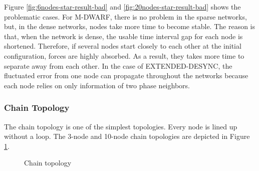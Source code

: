 Figure \ref{fig:6nodes-star-result-bad} and \ref{fig:20nodes-star-result-bad} shows the problematic cases. For M-DWARF, there is no problem in the sparse networks, but, in the dense networks, nodes take more time to become stable. The reason is that, when the network is dense, the usable time interval gap for each node is shortened. Therefore, if several nodes start closely to each other at the initial configuration, forces are highly absorbed. As a result, they takes more time to separate away from each other. In the case of EXTENDED-DESYNC, the fluctuated error from one node can propagate throughout the networks because each node relies on only information of two phase neighbors.




\subsubsection{Chain Topology}
The chain topology is one of the simplest topologies. Every node is lined up without a loop. The 3-node and 10-node chain topologies are depicted in Figure \ref{fig:chain-eval}. 
\begin{figure}[!t]
\caption{Chain topology}
\label{fig:chain-eval}
\lofcont
\end{figure}
